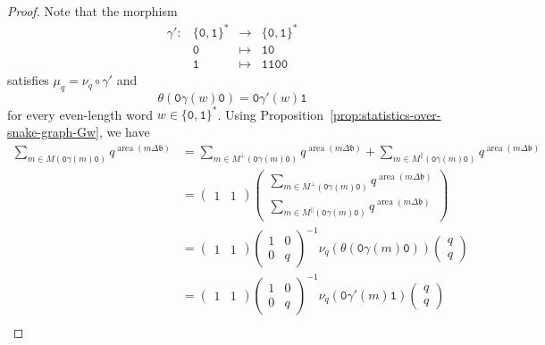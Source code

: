 \documentclass[a4paper,12pt]{amsart}
\newcommand{\bfrak}{{\mathfrak{b}}}
\newcommand{\0}{\mathtt{0}}
\newcommand{\1}{\mathtt{1}}
\newcommand{\2}{\mathtt{2}}
\newcommand{\3}{\mathtt{3}}
\newcommand{\carreplein}{{\perp}}
\newcommand{\carrevide}{{\parallel}}
\DeclareMathOperator{\area}{area}
\begin{document}
\begin{proof}
    Note that the morphism
    \[
    \begin{array}{rccl}
        \gamma':&\{\0,\1\}^*&\to& \{\0,\1\}^*\\
        &\0&\mapsto &\1\0\\
        &\1&\mapsto &\1\1\0\0
    \end{array}
    \]
    satisfies $\mu_q=\nu_q\circ \gamma'$ and
    \[
        \theta(\0\gamma(w)\0)=\0\gamma'(w)\1
    \]
    for every even-length word $w\in\{\0,\1\}^*$.
    Using Proposition~\ref{prop:statistics-over-snake-graph-Gw},
    we have
    \begingroup
    \allowdisplaybreaks
    \begin{align*}
        \sum_{m\in M(\0\gamma(m)\0)} q^{\area(m\Delta\bfrak)}
        &=\sum_{m\in M^\carreplein(\0\gamma(m)\0)} q^{\area(m\Delta\bfrak)}
         +\sum_{m\in M^\carrevide (\0\gamma(m)\0)} q^{\area(m\Delta\bfrak)}\\
        &=
        \left(\begin{array}{cc} 1 & 1 \end{array}\right)
        \left(\begin{array}{cc}
            \sum_{m\in M^\carreplein(\0\gamma(m)\0)} q^{\area(m\Delta\bfrak)}\\
            \sum_{m\in M^\carrevide (\0\gamma(m)\0)} q^{\area(m\Delta\bfrak)}
        \end{array}\right)
            \\
        &=
        \left(\begin{array}{cc} 1 & 1 \end{array}\right)
        \left(\begin{smallmatrix} 1 & 0 \\ 0 & q \end{smallmatrix}\right)^{-1}
            \nu_q(\theta(\0\gamma(m)\0))
        \left(\begin{smallmatrix} q \\ q \end{smallmatrix}\right)\\
        &=
        \left(\begin{array}{cc} 1 & 1 \end{array}\right)
        \left(\begin{smallmatrix} 1 & 0 \\ 0 & q \end{smallmatrix}\right)^{-1}
            \nu_q(\0\gamma'(m)\1)
        \left(\begin{smallmatrix} q \\ q \end{smallmatrix}\right)\\

\end{align*}
\end{proof}
\end{document}
